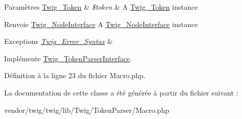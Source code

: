 \begin{DoxyParams}[1]{Paramètres}
\hyperlink{class_twig___token}{Twig\+\_\+\+Token} & {\em \$token} & A \hyperlink{class_twig___token}{Twig\+\_\+\+Token} instance\\
\hline
\end{DoxyParams}
\begin{DoxyReturn}{Renvoie}
\hyperlink{interface_twig___node_interface}{Twig\+\_\+\+Node\+Interface} A \hyperlink{interface_twig___node_interface}{Twig\+\_\+\+Node\+Interface} instance
\end{DoxyReturn}

\begin{DoxyExceptions}{Exceptions}
{\em \hyperlink{class_twig___error___syntax}{Twig\+\_\+\+Error\+\_\+\+Syntax}} & \\
\hline
\end{DoxyExceptions}


Implémente \hyperlink{interface_twig___token_parser_interface_a5dfa2e269321584fb74e8b43dabe0efd}{Twig\+\_\+\+Token\+Parser\+Interface}.



Définition à la ligne 23 du fichier Macro.\+php.



La documentation de cette classe a été générée à partir du fichier suivant \+:\begin{DoxyCompactItemize}
\item 
vendor/twig/twig/lib/\+Twig/\+Token\+Parser/Macro.\+php\end{DoxyCompactItemize}
